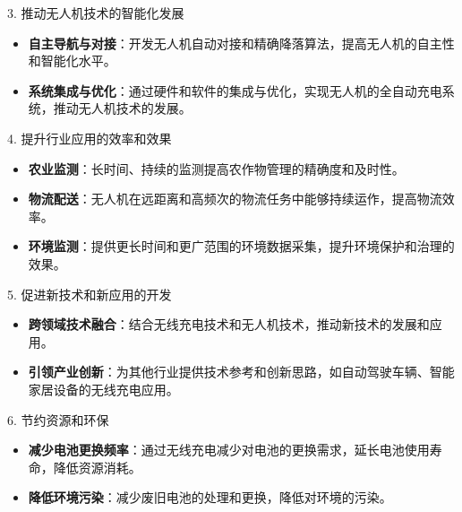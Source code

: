 \begin{frame}
  \begin{block}{3. 推动无人机技术的智能化发展}
      \begin{itemize}
          \item \textbf{自主导航与对接}：开发无人机自动对接和精确降落算法，提高无人机的自主性和智能化水平。
          \item \textbf{系统集成与优化}：通过硬件和软件的集成与优化，实现无人机的全自动充电系统，推动无人机技术的发展。
      \end{itemize}
  \end{block}
  
  \begin{block}{4. 提升行业应用的效率和效果}
      \begin{itemize}
          \item \textbf{农业监测}：长时间、持续的监测提高农作物管理的精确度和及时性。
          \item \textbf{物流配送}：无人机在远距离和高频次的物流任务中能够持续运作，提高物流效率。
          \item \textbf{环境监测}：提供更长时间和更广范围的环境数据采集，提升环境保护和治理的效果。
      \end{itemize}
  \end{block}
\end{frame}

\begin{frame}
  \begin{block}{5. 促进新技术和新应用的开发}
      \begin{itemize}
          \item \textbf{跨领域技术融合}：结合无线充电技术和无人机技术，推动新技术的发展和应用。
          \item \textbf{引领产业创新}：为其他行业提供技术参考和创新思路，如自动驾驶车辆、智能家居设备的无线充电应用。
      \end{itemize}
  \end{block}


  \begin{block}{6. 节约资源和环保}
      \begin{itemize}
          \item \textbf{减少电池更换频率}：通过无线充电减少对电池的更换需求，延长电池使用寿命，降低资源消耗。
          \item \textbf{降低环境污染}：减少废旧电池的处理和更换，降低对环境的污染。
      \end{itemize}
  \end{block}
  
\end{frame}